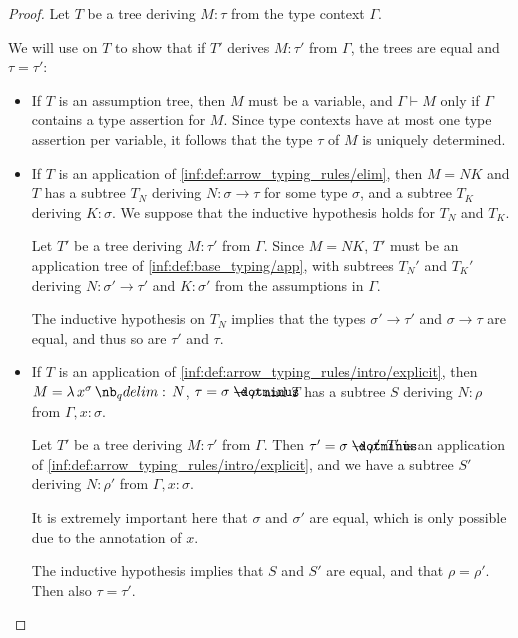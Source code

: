 \begin{proof}
  Let \( T \) be a tree deriving \( M: \tau \) from the type context \( \Gamma \).

  We will use  on \( T \) to show that if \( T' \) derives \( M: \tau' \) from \( \Gamma \), the trees are equal and \( \tau = \tau' \):
  \begin{itemize}
    \item If \( T \) is an assumption tree, then \( M \) must be a variable, and \( \Gamma \vdash M \) only if \( \Gamma \) contains a type assertion for \( M \). Since type contexts have at most one type assertion per variable, it follows that the type \( \tau \) of \( M \) is uniquely determined.

    \item If \( T \) is an application of \ref{inf:def:arrow_typing_rules/elim}, then \( M = NK \) and \( T \) has a subtree \( T_N \) deriving \( N: \sigma \to \tau \) for some type \( \sigma \), and a subtree \( T_K \) deriving \( K: \sigma \). We suppose that the inductive hypothesis holds for \( T_N \) and \( T_K \).

    Let \( T' \) be a tree deriving \( M: \tau' \) from \( \Gamma \). Since \( M = NK \), \( T' \) must be an application tree of \ref{inf:def:base_typing/app}, with subtrees \( T_N' \) and \( T_K' \) deriving \( N: \sigma' \to \tau' \) and \( K: \sigma' \) from the assumptions in \( \Gamma \).

    The inductive hypothesis on \( T_N \) implies that the types \( \sigma' \to \tau' \) and \( \sigma \to \tau \) are equal, and thus so are \( \tau' \) and \( \tau \).

    \item If \( T \) is an application of \ref{inf:def:arrow_typing_rules/intro/explicit}, then \( M = \qabs {x^\sigma} N \), \( \tau = \sigma \synimplies \rho \) and \( T \) has a subtree \( S \) deriving \( N: \rho \) from \( \Gamma, x: \sigma \).

    Let \( T' \) be a tree deriving \( M: \tau' \) from \( \Gamma \). Then \( \tau' = \sigma \synimplies \rho' \) \( T' \) is an application of \ref{inf:def:arrow_typing_rules/intro/explicit}, and we have a subtree \( S' \) deriving \( N: \rho' \) from \( \Gamma, x: \sigma \).

    It is extremely important here that \( \sigma \) and \( \sigma' \) are equal, which is only possible due to the annotation of \( x \).

    The inductive hypothesis implies that \( S \) and \( S' \) are equal, and that \( \rho = \rho' \). Then also \( \tau = \tau' \).
  \end{itemize}
\end{proof}
